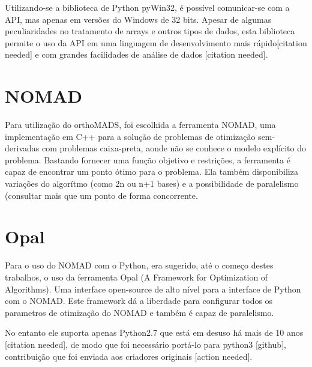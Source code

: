  Utilizando-se a biblioteca de Python pyWin32, é possível comunicar-se com a API, mas apenas em versões do Windows de 32 bits. Apesar de algumas peculiaridades no tratamento de arrays e outros tipos de dados, esta biblioteca permite o uso da API em uma linguagem de desenvolvimento mais rápido[citation needed] e com grandes facilidades de análise de dados [citation needed].

\section{NOMAD}
Para utilização do orthoMADS, foi escolhida a ferramenta NOMAD, uma implementação em C++ para a solução de problemas de otimização sem-derivadas com problemas caixa-preta, aonde não se conhece o modelo explícito do problema. Bastando fornecer uma função objetivo e restrições, a ferramenta é capaz de encontrar um ponto ótimo para o problema. Ela também  disponibiliza variações do algorítmo (como 2n ou n+1 bases) e a possibilidade de paralelismo (consultar mais que um ponto de forma concorrente.  


\section{Opal}
Para o uso do NOMAD com o Python, era sugerido, até o começo destes trabalhos, o uso da ferramenta Opal (A Framework for Optimization of Algorithms). Uma interface open-source de alto nível para a interface de Python com o NOMAD. Este framework dá a liberdade para configurar todos os parametros de otimização do NOMAD e também é capaz de paralelismo.

No entanto ele suporta apenas Python2.7 que está em desuso há mais de 10 anos [citation needed], de modo que foi necessário portá-lo para python3 [github], contribuição que foi enviada aos criadores originais [action needed].




